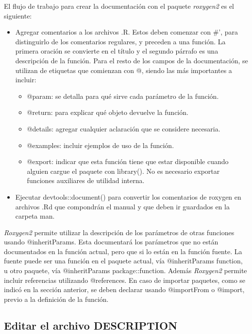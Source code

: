 El flujo de trabajo para crear la documentación con el paquete \emph{roxygen2} es el siguiente:

\begin{itemize}
\item Agregar comentarios a los archivos .R. Estos deben comenzar con \#', para distinguirlo de los comentarios regulares, y preceden a una función. La primera oración se convierte en el título y el segundo párrafo es una descripción de la función. Para el resto de los campos de la documentación, se utilizan de etiquetas que comienzan con @, siendo las más importantes a incluir:

\begin{itemize}
\item @param: se detalla para qué sirve cada parámetro de la función.
\item @return: para explicar qué objeto devuelve la función.
\item @details: agregar cualquier aclaración que se considere necesaria.
\item @examples: incluir ejemplos de uso de la función.
\item @export: indicar que esta función tiene que estar disponible cuando alguien cargue el paquete con library(). No es necesario exportar funciones auxiliares de utilidad interna.
\end{itemize}

\item Ejecutar devtools::document() para convertir los comentarios de roxygen en archivos .Rd que compondrán el manual y que deben ir guardados en la carpeta man.
\end{itemize}


\emph{Roxygen2} permite utilizar la descripción de los parámetros de otras funciones usando @inheritParams. Esta documentará los parámetros que no están documentados en la función actual, pero que si lo están en la función fuente. La fuente puede ser una función en el paquete actual, vía @inheritParams function, u otro paquete, vía @inheritParams package::function. Además \emph{Roxygen2} permite incluir referencias utilizando @references. En caso de importar paquetes, como se indicó en la sección anterior, se deben declarar usando @importFrom o @import, previo a la definición de la función.


\subsection{Editar el archivo DESCRIPTION}

